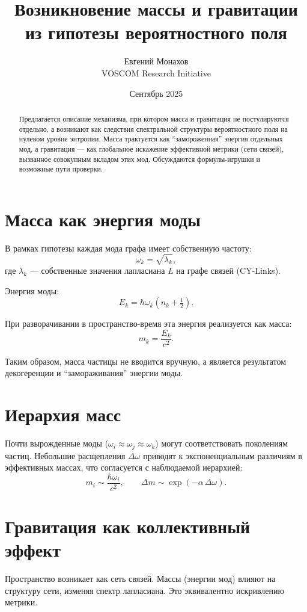 \documentclass[12pt,a4paper]{article}
\title{Возникновение массы и гравитации \\
из гипотезы вероятностного поля}
\author{Евгений Монахов \\ VOSCOM Research Initiative}
\date{Сентябрь 2025}
\begin{document}
\maketitle

\begin{abstract}
Предлагается описание механизма, при котором масса и гравитация не постулируются отдельно, а возникают как следствия спектральной структуры вероятностного поля на нулевом уровне энтропии. Масса трактуется как ``замороженная'' энергия отдельных мод, а гравитация --- как глобальное искажение эффективной метрики (сети связей), вызванное совокупным вкладом этих мод. Обсуждаются формулы-игрушки и возможные пути проверки.
\end{abstract}

\section{Масса как энергия моды}
В рамках гипотезы каждая мода графа имеет собственную частоту:
\[
\omega_k = \sqrt{\lambda_k},
\]
где $\lambda_k$ --- собственные значения лапласиана $L$ на графе связей (CY-Links).

Энергия моды:
\[
E_k = \hbar \omega_k \left(n_k + \tfrac{1}{2}\right).
\]

При разворачивании в пространство-время эта энергия реализуется как масса:
\[
m_k = \frac{E_k}{c^2}.
\]

Таким образом, масса частицы не вводится вручную, а является результатом декогеренции и ``замораживания'' энергии моды.

\section{Иерархия масс}
Почти вырожденные моды ($\omega_i \approx \omega_j \approx \omega_k$) могут соответствовать поколениям частиц. Небольшие расщепления $\Delta\omega$ приводят к экспоненциальным различиям в эффективных массах, что согласуется с наблюдаемой иерархией:
\[
m_i \sim \frac{\hbar \omega_i}{c^2}, 
\qquad
\Delta m \sim \exp(-\alpha \, \Delta \omega).
\]

\section{Гравитация как коллективный эффект}
Пространство возникает как сеть связей. Массы (энергии мод) влияют на структуру сети, изменяя спектр лапласиана. Это эквивалентно искривлению метрики.
\end{document}
